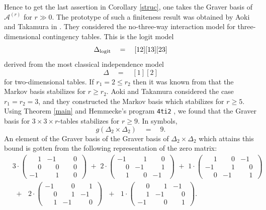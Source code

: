 \documentclass[11pt]{amsart}
\theoremstyle{definition}
\newcommand{\A}{{\mathcal A}}
\begin{document}
Hence to get the last assertion in Corollary \ref{struc},
one takes the Graver basis of $\A^{(r)}$ for $r \gg 0$.
The prototype of such a finiteness result   was obtained by
Aoki and Takamura in \cite{AS1}.
They considered the no-three-way interaction
model for three-dimensional contingency tables. This is the
logit model
$$ \Delta_{\rm logit} \quad = \quad [12][13][23] $$
derived from the most classical independence model
$$ \Delta \quad = \quad [1][2] $$
for two-dimensional tables.
If $r_1 = 2 \leq r_2$ then it was known from \cite{Diaconis}
that the Markov basis stabilizes for $r \geq r_2$. Aoki
and Takamura \cite{AS1} considered the case $r_1 = r_2 = 3$,
and they constructed the Markov basis which stabilizes
for $r \geq 5$. Using Theorem \ref{main} and
  Hemmecke's  program {\tt 4ti2} \cite{Hem},
  we found that the Graver basis
for $3 \times 3 \times r$-tables stabilizes
for $r \geq 9$. In symbols,
$$ g(\Delta_2 \times \Delta_2) \quad = \quad 9 .$$
An element of the Graver basis of the
Graver basis of $\Delta_2 \times \Delta_2$ which
attains this bound is gotten from the following
representation of the zero matrix:
\begin{eqnarray*}
& 3 \cdot 
\begin{pmatrix}
\phantom{-} 1 &  -1 & \phantom{-} 0 \, \\
\phantom{-} 0 & \phantom{-} 0 & \phantom{-} 0\, \\
 -1 & \phantom{-} 1 & \phantom{-} 0 \,
\end{pmatrix}
\,\, + \,\,
2 \cdot 
\begin{pmatrix}
 -1 &  \phantom{-} 1 & \phantom{-} 0 \, \\
\phantom{-}  0 &  -1 & \phantom{-} 1 \, \\
\phantom{-}  1 &  \phantom{-} 0 & -1 \, 
\end{pmatrix}
\,\, + \,\,
1 \cdot 
\begin{pmatrix}
\phantom{-}  1 & \phantom{-}  0 & -1 \, \\
 -1 & \phantom{-}  1 &\phantom{-}  0 \, \\
\phantom{-}  0 &  -1 & \phantom{-} 1\,  
\end{pmatrix}
\\ & \,\, + \,\,\,\,
2 \cdot 
\begin{pmatrix}
 -1 &  \phantom{-} 0 & \phantom{-} 1 \, \\
\phantom{-}  0 & \phantom{-}  1 & -1 \, \\
\phantom{-}  1 &  -1 &\phantom{-}  0 \, 
\end{pmatrix}
\,\,\,\, + \,\,\,\,
1 \cdot 
\begin{pmatrix}
\phantom{-}  0 & \phantom{-}  1 & -1 \, \\
\phantom{-}  1 &  -1 &\phantom{-}  0 \, \\
 -1 & \phantom{-}  0 &\phantom{-}  1 \, 
\end{pmatrix}.
\end{eqnarray*}
\end{document}
